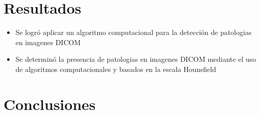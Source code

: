\documentclass{article}
\begin{document}
	\section{Resultados}
	\begin{itemize}
		\item Se logró aplicar  un algoritmo computacional para la detección de patologias en imagenes DICOM
		\item Se determinó la presencia de patologias en imagenes DICOM mediante el uso de algoritmos computacionales y basados en la escala Hounsfield
		\end{itemize}
		


	\section{Conclusiones}


	
	
\end{document}
